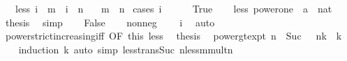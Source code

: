 \begin{isabellebody}
\ \ \ less{\isacharcolon}{\kern0pt}\ {\isachardoublequoteopen}i\ {\isacharcircum}{\kern0pt}\ m\ {\isacharless}{\kern0pt}\ i\ {\isacharcircum}{\kern0pt}\ n{\isachardoublequoteclose}\isanewline
\ \ \ {\isachardoublequoteopen}m\ {\isacharless}{\kern0pt}\ n{\isachardoublequoteclose}\isanewline
%
\isadelimproof
%
\endisadelimproof
%
\isatagproof
{}\isamarkupfalse%
\ {\isacharparenleft}{\kern0pt}cases\ {\isachardoublequoteopen}i\ {\isacharequal}{\kern0pt}\ {}{\isachardoublequoteclose}{\isacharparenright}{\kern0pt}\isanewline
\ \ \isamarkupfalse%
\ True\isanewline
\ \ \isamarkupfalse%
\ less\ power{\isacharunderscore}{\kern0pt}one\ {\isacharbrackleft}{\kern0pt}\ {\isacharprime}{\kern0pt}a\ {\isacharequal}{\kern0pt}\ nat{\isacharbrackright}{\kern0pt}\ \isamarkupfalse%
\ {\isacharquery}{\kern0pt}thesis\ \isamarkupfalse%
\ simp\isanewline
{}\isamarkupfalse%
\isanewline
\ \ \isamarkupfalse%
\ False\isanewline
\ \ \isamarkupfalse%
\ nonneg\ \isamarkupfalse%
\ {\isachardoublequoteopen}{}\ {\isacharless}{\kern0pt}\ i{\isachardoublequoteclose}\ \isamarkupfalse%
\ auto\isanewline
\ \ \isamarkupfalse%
\ power{\isacharunderscore}{\kern0pt}strict{\isacharunderscore}{\kern0pt}increasing{\isacharunderscore}{\kern0pt}iff\ {\isacharbrackleft}{\kern0pt}OF\ this{\isacharbrackright}{\kern0pt}\ less\ \isamarkupfalse%
\ {\isacharquery}{\kern0pt}thesis\ \isacommand{{\isachardot}{\kern0pt}{\isachardot}{\kern0pt}}\isamarkupfalse%
\isanewline
{}\isamarkupfalse%
%
\endisatagproof
{\isafoldproof}%
%
\isadelimproof
\isanewline
%
\endisadelimproof
\isanewline
{}\isamarkupfalse%
\ power{\isacharunderscore}{\kern0pt}gt{\isacharunderscore}{\kern0pt}expt{\isacharcolon}{\kern0pt}\ {\isachardoublequoteopen}n\ {\isachargreater}{\kern0pt}\ Suc\ {}\ {\isasymLongrightarrow}\ n{\isacharcircum}{\kern0pt}k\ {\isachargreater}{\kern0pt}\ k{\isachardoublequoteclose}\isanewline
%
\isadelimproof
\ \ %
\endisadelimproof
%
\isatagproof
{}\isamarkupfalse%
\ {\isacharparenleft}{\kern0pt}induction\ k{\isacharparenright}{\kern0pt}\ {\isacharparenleft}{\kern0pt}auto\ simp{\isacharcolon}{\kern0pt}\ less{\isacharunderscore}{\kern0pt}trans{\isacharunderscore}{\kern0pt}Suc\ n{\isacharunderscore}{\kern0pt}less{\isacharunderscore}{\kern0pt}m{\isacharunderscore}{\kern0pt}mult{\isacharunderscore}{\kern0pt}n{\isacharparenright}{\kern0pt}%

\end{isabellebody}
